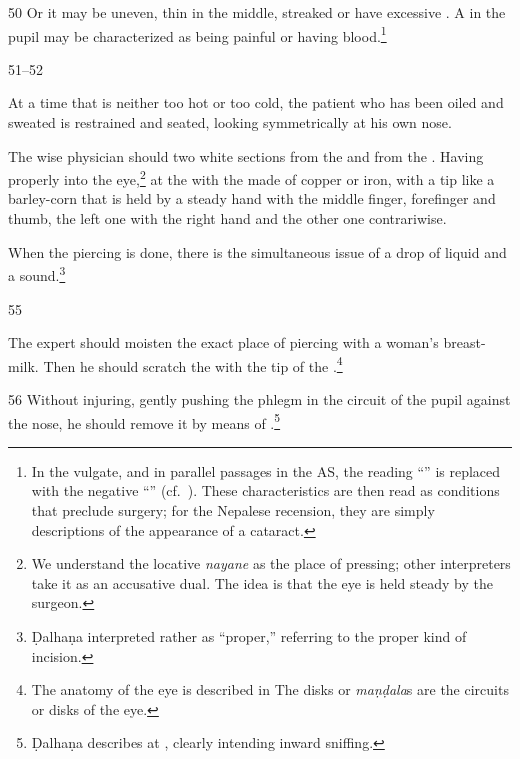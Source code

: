 \begin{translation}
    \item [50] Or it may be uneven, thin in the middle, streaked or have excessive
    . A  in the pupil may be characterized as being
    painful or having blood.\footnote{In the vulgate, and in parallel passages in the
    AS, the reading “” is replaced with the negative “” (cf.\ ).   These characteristics are then
    read as conditions that preclude surgery;  for the Nepalese recension, they are
    simply descriptions of the appearance of a cataract.}
    
    \item [51--52]
    
    At a time that is neither too hot or too cold, 
    the patient who has been oiled and sweated
    is restrained and seated, looking symmetrically at his own nose.
    
    The wise physician should  two white sections from the
     and from the . Having
     properly into the eye,\footnote{We 
    understand the
    locative \emph{nayane} as the place of pressing; other interpreters take it as an
    accusative dual.  The idea is that the eye is held steady by the surgeon.} at the
      with the 
    made of copper or iron, with a tip like a barley-corn that is held by a steady
    hand with the middle finger, forefinger and thumb,
    the left one with the right hand and the other one contrariwise.
    
    When the piercing is done, there is the simultaneous issue of a drop of liquid and a 
    sound.\footnote{Ḍalhaṇa interpreted  rather as “proper,” 
    referring to the proper kind of incision.}
    
    \item [55]
    
    The expert should moisten the exact place of piercing  with a woman's breast-milk.  Then 
    he 
    should scratch the  with the tip of the 
    .\footnote{The anatomy of the eye is described in 
    The disks or 
    \emph{maṇḍala}s are the circuits or disks of the eye.}
    
    \item[56]
    Without injuring, gently pushing the phlegm in the circuit of the pupil against the nose, he 
    should remove it by means of .\footnote{Ḍalhaṇa describes 
     at 
    , clearly intending inward sniffing.}
    

\end{translation}
